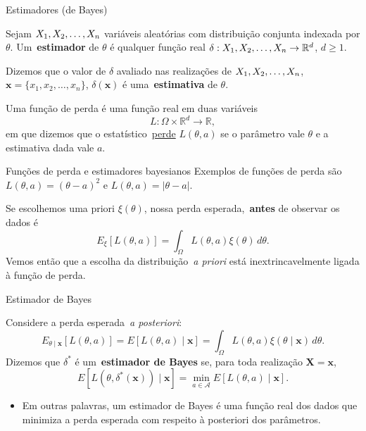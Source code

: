 \begin{frame}{Estimadores (de Bayes)}
\begin{defn}[Estimador]
\label{def:estimator}
Sejam $X_1, X_2, \ldots, X_n$ variáveis aleatórias com distribuição conjunta indexada por $\theta$.
Um~\textbf{estimador} de $\theta$ é qualquer função real $\delta: X_1, X_2, \ldots, X_n \to \mathbb{R}^d$, $d\geq 1$. 
\end{defn}
\begin{defn}[Estimativa]
\label{def:estimate}
Dizemos que o valor de $\delta$ avaliado nas realizações de $X_1, X_2, \ldots, X_n$, $\boldsymbol x = \{ x_1, x_2, \ldots, x_n\}$,  $\delta(\boldsymbol{x})$ é uma~\textbf{estimativa} de $\theta$.
\end{defn}

\begin{defn}
\label{def:loss_function}
Uma função de perda é uma função real em duas variáveis 
\[ L : \Omega \times \mathbb{R}^d \to \mathbb{R}, \]
em que dizemos que o estatístico~\underline{perde} $L(\theta, a)$ se o parâmetro vale $\theta$ e a estimativa dada vale $a$.
\end{defn} 
\end{frame}

\begin{frame}{Funções de perda e estimadores bayesianos}
Exemplos de funções de perda são $L(\theta, a) = (\theta-a)^2$ e $L(\theta, a) = |\theta-a|$.
\begin{obs}
Se escolhemos uma priori $\xi(\theta)$, nossa perda esperada,~\textbf{antes} de observar os dados é
\begin{equation*}
 E_\xi[L(\theta, a)] = \int_{\Omega} L(\theta, a)\xi(\theta)\,d\theta.
\end{equation*}
Vemos então que a escolha da distribuição~\textit{a priori} está inextrincavelmente ligada à função de perda.
\end{obs}
\end{frame}

\begin{frame}{Estimador de Bayes}
 \begin{defn}
 \label{def:Bayes_estimator}
  Considere a perda esperada~\textit{a posteriori}:
  \begin{equation*}
   E_{\theta \mid \boldsymbol{x}}\left[L(\theta, a) \right] = E[L(\theta, a) \mid \boldsymbol{x}] = \int_{\Omega} L(\theta, a)\xi(\theta \mid \boldsymbol{x})\, d\theta. 
  \end{equation*}
Dizemos que $\delta^\ast$ é um~\textbf{estimador de Bayes} se, para toda realização $\boldsymbol{X} = \boldsymbol{x}$,
\begin{equation*}
 E[L(\theta, \delta^\ast(\boldsymbol{x}) ) \mid \boldsymbol{x}] = \min_{a \in \mathcal{A}}   E[L(\theta, a) \mid \boldsymbol{x}].
\end{equation*}
 \end{defn}
\begin{itemize}
 \item Em outras palavras, um estimador de Bayes é uma função real dos dados que minimiza a perda esperada com respeito à posteriori dos parâmetros.
\end{itemize} 
\end{frame}

